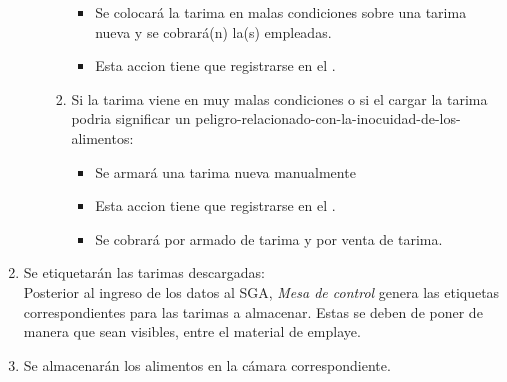 \begin{enumerate}
\begin{enumerate}
\begin{enumerate}
\begin{itemize}
                    \item Se colocará la tarima en malas condiciones sobre una tarima nueva y se cobrará(n) la(s) empleadas.
                    \item Esta accion tiene que registrarse en el \Oent.
                \end{itemize}
            \item Si la tarima viene en muy malas condiciones o si el cargar la tarima podria significar un \gls{peligro-relacionado-con-la-inocuidad-de-los-alimentos}:
                \begin{itemize}
                    \item Se armará una tarima nueva manualmente
                    \item Esta accion tiene que registrarse en el \Oent.
                    \item Se cobrará por armado de tarima y por venta de tarima.
                \end{itemize}
        \end{enumerate}
    \end{enumerate}
    \item Se etiquetarán las tarimas descargadas:\\
    Posterior al ingreso de los datos al \gls{SGA}, \emph{Mesa de control} genera las etiquetas correspondientes para las tarimas a almacenar. Estas se deben de poner de manera que sean visibles, entre el material de emplaye.
    \item Se almacenarán los alimentos en la cámara correspondiente.
\end{enumerate}

